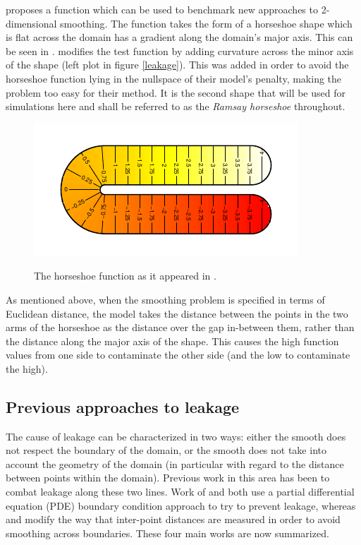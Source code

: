 \label{ramsayfunc}

 proposes a function which can be used to benchmark new approaches to 2-dimensional smoothing. The function takes the form of a horseshoe shape which is flat across the domain has a gradient along the domain's major axis. This can be seen in .  modifies the test function by adding curvature across the minor axis of the shape (left plot in figure \ref{leakage}). This was added in order to avoid the horseshoe function lying in the nullspace of their model's penalty, making the problem too easy for their method. It is the second shape that will be used for simulations here and shall be referred to as the \emph{Ramsay horseshoe} throughout.

\begin{figure}
\centering
\includegraphics{intro/figs/orig-fs.pdf}\\
\caption{The horseshoe function as it appeared in .}
\label{orig-fs}
\end{figure}

As mentioned above, when the smoothing problem is specified in terms of Euclidean distance, the model takes the distance between the points in the two arms of the horseshoe as the distance over the gap in-between them, rather than the distance along the major axis of the shape. This causes the high function values from one side to contaminate the other side (and the low to contaminate the high).
		
\subsection{Previous approaches to leakage}
\label{intro-leakageapproaches}

The cause of leakage can be characterized in two ways: either the smooth does not respect the boundary of the domain, or the smooth does not take into account the geometry of the domain (in particular with regard to the distance between points within the domain). Previous work in this area has been to combat leakage along these two lines. Work of  and  both use a partial differential equation (PDE) boundary condition approach to try to prevent leakage, whereas  and  modify the way that inter-point distances are measured in order to avoid smoothing across boundaries. These four main works are now summarized.

